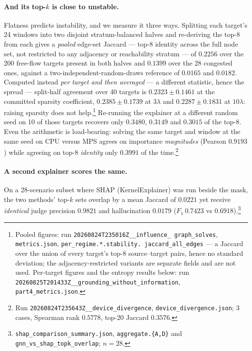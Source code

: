 \documentclass{article}
\begin{document}
\paragraph{And its top-$k$ is close to unstable.} Flatness predicts instability, and
we measure it three ways. Splitting each target's 24 windows into two disjoint
stratum-balanced halves and re-deriving the top-8 from each gives a \emph{pooled}
edge-set Jaccard --- top-8 identity across the full node set, not restricted to any
adjacency or reachability stratum --- of $0.2256$ over the 200 free-flow targets
present in both halves and $0.1399$ over the 28 congested ones, against a
two-independent-random-draws reference of $0.0165$ and
$0.0182$. Computed instead \emph{per target and then averaged} --- a
different statistic, hence the spread --- split-half agreement over 40 targets is
$0.2323\pm0.1461$ at the committed sparsity coefficient, $0.2385\pm0.1739$ at
$3\lambda$ and $0.2287\pm0.1831$ at $10\lambda$: raising sparsity does not
help.\footnote{Pooled figures: run \texttt{20260824T235016Z\_\_influence\_\allowbreak
graph\_solves}, \texttt{metrics.json}, \texttt{per\_regime.*.stability.\allowbreak
jaccard\_all\_edges} --- a Jaccard over the union of every target's top-8
source--target pairs, hence no standard deviation; the adjacency-restricted variants
are separate fields and are not used. Per-target figures and the entropy results
below: run \texttt{20260825T201433Z\_\_grounding\_\allowbreak without\_information},
\texttt{part4\_metrics.json}.} Re-running the explainer at a different random seed on 10 of those
targets recovers only $0.3480$, $0.3149$ and $0.3015$ of the top-8. Even the
arithmetic is load-bearing: solving the same target and window at the same seed on
CPU versus MPS agrees on importance \emph{magnitudes} (Pearson $0.9193$) while
agreeing on top-8 \emph{identity} only $0.3991$ of the
time.\footnote{Run \texttt{20260824T235643Z\_\_device\_\allowbreak divergence},
\texttt{device\_divergence.json}; 3 cases, Spearman rank $0.5778$, top-20 Jaccard
$0.3576$.}

\paragraph{A second explainer scores the same.} On a 28-scenario subset where
SHAP (KernelExplainer) was run beside the mask, the two methods' top-$k$ sets
overlap by a mean Jaccard of $0.0221$ yet receive \emph{identical} judge precision
$0.9821$ and hallucination $0.0179$ ($F_1\ 0.7423$ vs
$0.6918$).\footnote{\texttt{shap\_comparison\_summary.json},
\texttt{aggregate.\{A,D\}} and \texttt{gnn\_vs\_shap\_topk\_overlap}; $n{=}28$.}
\end{document}
